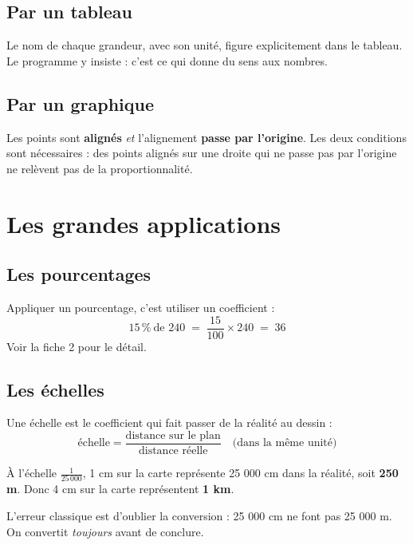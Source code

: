 \documentclass{fiche}
\begin{document}
\subsection{Par un tableau}
Le nom de chaque grandeur, avec son unité, figure explicitement dans le tableau.
Le programme y insiste : c'est ce qui donne du sens aux nombres.

\subsection{\niv{5\ieme} Par un graphique}

\begin{retenir}
Les points sont \textbf{alignés} \emph{et} l'alignement \textbf{passe par l'origine}.
Les deux conditions sont nécessaires : des points alignés sur une droite qui ne
passe pas par l'origine ne relèvent pas de la proportionnalité.
\end{retenir}

\begin{center}
\end{center}

\section{Les grandes applications}

\subsection{Les pourcentages}
Appliquer un pourcentage, c'est utiliser un coefficient :
\[15\,\%\ \text{de }240 \;=\; \frac{15}{100}\times 240 \;=\; 36\]
Voir la fiche 2 pour le détail.

\subsection{Les échelles}
\begin{definition}
Une échelle est le coefficient qui fait passer de la réalité au dessin :
\[\text{échelle} = \frac{\text{distance sur le plan}}{\text{distance réelle}}
\quad\text{(dans la même unité)}\]
\end{definition}

À l'échelle $\tfrac{1}{25\,000}$, 1 cm sur la carte représente 25 000 cm dans la
réalité, soit \textbf{250 m}. Donc 4 cm sur la carte représentent \textbf{1 km}.

\begin{piege}
L'erreur classique est d'oublier la conversion : 25 000 cm ne font pas 25 000 m.
On convertit \emph{toujours} avant de conclure.
\end{piege}
\end{document}
